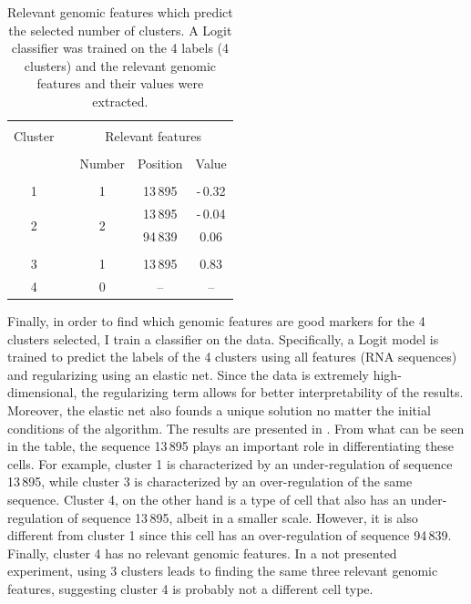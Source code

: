 \documentclass[11pt, english, twocolumn]{article}
\begin{document}
\begin{table}[b]
	\caption{Relevant genomic features which predict the selected number of clusters. A Logit classifier was trained on the 4 labels (4 clusters) and the relevant genomic features and their values were extracted.}
	\label{tab:trapnell-logit}
	\begin{tabular}{ccccc}
		\hline\hline
		\\[-1.5ex]
		\multirow{2.5}{*}{Cluster}
					&&	\multicolumn{3}{c}{Relevant features}	\\[0.5ex]\cline{3-5}
					\\[-1.5ex]
					&&	Number		&	Position	&	Value	\\[0.5ex] \hline
		\\[-1.5ex]
		1			&&	1			&	13\,895		&	-\,0.32	\\[1ex]
		\multirow{2}{*}{2}
					&&	\multirow{2}{*}{2}
									&	13\,895		&	-\,0.04	\\
					&&				&	94\,839		&	\hspace{1ex}0.06	\\
		\\[-1.5ex]
		3			&&	1			&	13\,895		&	0.83	\\[1ex]
		4			&&	0			&	--			&	--		\\[0.5ex]
		\hline\hline
	\end{tabular}

\end{table}

Finally, in order to find which genomic features are good markers for the 4 clusters selected, I train a classifier on the data. Specifically, a Logit model is trained to predict the labels of the 4 clusters using all features (RNA sequences) and regularizing using an elastic net. Since the data is extremely high-dimensional, the regularizing term allows for better interpretability of the results. Moreover, the elastic net also founds a unique solution no matter the initial conditions of the algorithm. The results are presented in . From what can be seen in the table, the sequence 13\,895 plays an important role in differentiating these cells. For example, cluster 1 is characterized by an under-regulation of sequence 13\,895, while cluster 3 is characterized by an over-regulation of the same sequence. Cluster 4, on the other hand is a type of cell that also has an under-regulation of sequence 13\,895, albeit in a smaller scale. However, it is also different from cluster 1 since this cell has an over-regulation of sequence 94\,839. Finally, cluster 4 has no relevant genomic features. In a not presented experiment, using 3 clusters leads to finding the same three relevant genomic features, suggesting cluster 4 is probably not a different cell type. 
\end{document}
